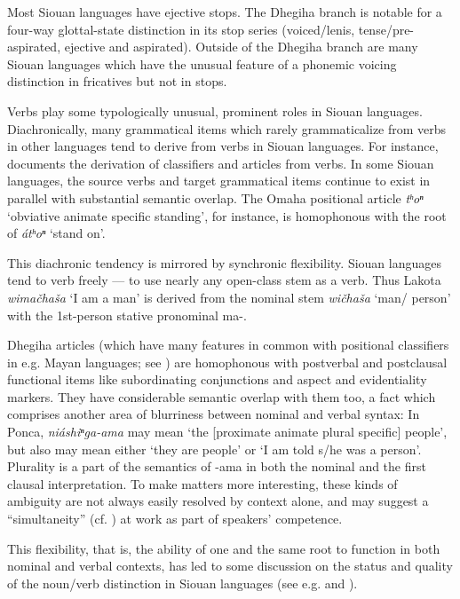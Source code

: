 \begin{refsection}
Most Siouan languages have ejective stops. The Dhegiha branch is notable for a four-way glottal-state distinction in its stop series (voiced/lenis, tense/pre-aspirated, ejective and aspirated). Outside of the Dhegiha branch are many Siouan languages which have the unusual feature of a phonemic voicing distinction in fricatives but not in stops.


Verbs play some typologically unusual, prominent roles in Siouan languages. Diachronically, many grammatical items which rarely grammaticalize from verbs in other languages tend to derive from verbs in Siouan languages. For instance, \citet{Rankin1977} documents the derivation of classifiers and articles from verbs. In some Siouan languages, the source verbs and target grammatical items continue to exist in parallel with substantial semantic overlap. The Omaha positional article \textit{tʰoⁿ} `obviative animate specific standing', for instance, is homophonous with the root of \textit{\'atʰoⁿ} `stand on'.


This diachronic tendency is mirrored by synchronic flexibility. Siouan languages tend to verb freely --- to use nearly any open-class stem as a verb. Thus Lakota \textit{wima\v{c}ha\v{s}a} `I am a man' is derived from the nominal stem \textit{wi\v{c}ha\v{s}a} `man/ person' with the 1st-person stative pronominal ma-.

Dhegiha articles (which have many features in common with positional classifiers in e.g. Mayan languages; see \citealt{Gordon2009}) are homophonous with postverbal and postclausal functional items like subordinating conjunctions and aspect and evidentiality markers. They have considerable semantic overlap with them too, a fact which comprises another area of blurriness between nominal and verbal syntax: In Ponca, \textit{ni\'ashiⁿga-ama} may mean `the [proximate animate plural specific] people', but also may mean either `they are people' or `I am told s/he was a person'. Plurality is a part of the semantics of -ama in both the nominal and the first clausal interpretation. To make matters more interesting, these kinds of ambiguity are not always easily resolved by context alone, and may suggest a ``simultaneity'' (cf. \citealt{Woolard1998}) at work as part of speakers' competence. 


This flexibility, that is, the ability of one and the same root to function in both nominal and verbal contexts, has led to some discussion on the status and quality of the noun/verb distinction in Siouan languages (see e.g. \citealt{Helmbrecht2002}  and \citet{Ingham2001}). 


\end{refsection}

